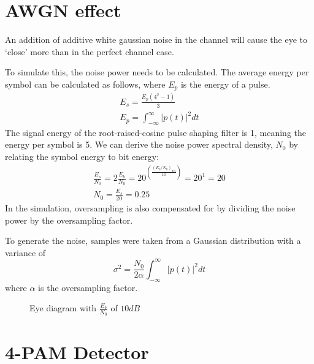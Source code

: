 \documentclass[11pt]{article}
\begin{document}
\section{AWGN effect}
An addition of additive white gaussian noise in the channel will cause the eye
to `close' more than in the perfect channel case.

To simulate this, the noise power needs to be calculated. The average energy per
symbol can be calculated as follows, where $E_p$ is the energy of a pulse.
\begin{equation}
    \begin{gathered}
        E_s = \frac{E_p (4^2-1)}{3}\\
        E_p = \int_{-\infty}^{\infty} |p(t)|^2 dt
    \end{gathered}
\end{equation}
The signal energy of the root-raised-cosine pulse shaping filter is 1, meaning
the energy per symbol is 5. We can derive the noise power spectral density,
$N_0$ by relating the symbol energy to bit energy:
\begin{equation}
    \begin{gathered}
        \frac{E_s}{N_0} = 2 \frac{E_b}{N_0} = 20^{\left( \frac{ (E_b/N_0)_{dB} }
                    {10} \right)} = 20^1 = 20\\
        N_0 = \frac{E_s}{20} = 0.25
    \end{gathered}
\end{equation}
In the simulation, oversampling is also compensated for by dividing the noise
power by the oversampling factor.

To generate the noise, samples were taken from a Gaussian distribution with a variance of
\begin{equation}
    \sigma^2 = \frac{N_0}{2\alpha} \int_{-\infty}^{\infty} |p(t)|^2 dt
\end{equation}
where $\alpha$ is the oversampling factor.

\begin{figure}[H]
    \centering
    \scalebox{0.7}{}
    \caption{Eye diagram with $\frac{E_b}{N_0}$ of $10dB$}
\end{figure}

\section{4-PAM Detector}
\end{document}
